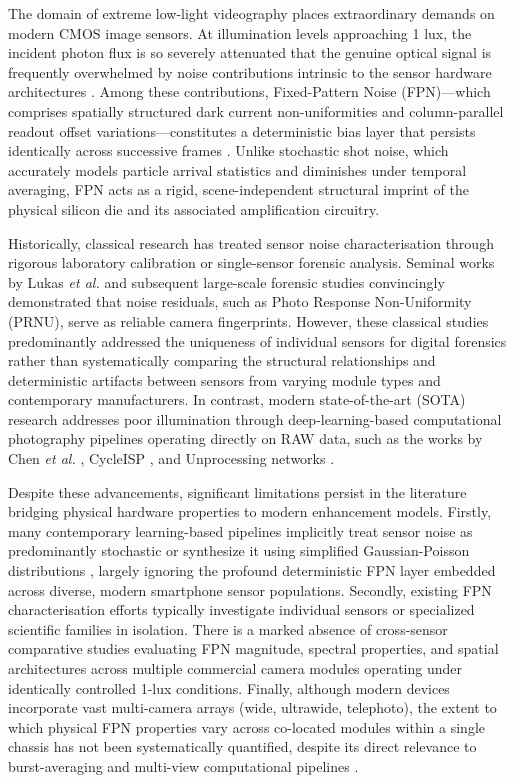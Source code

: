 \documentclass[conference]{IEEEtran}
\begin{document}
The domain of extreme low-light videography places extraordinary demands on modern CMOS image sensors. At illumination levels approaching 1 lux, the incident photon flux is so severely attenuated that the genuine optical signal is frequently overwhelmed by noise contributions intrinsic to the sensor hardware architectures \cite{el2005cmos, janesick2001scientific}. Among these contributions, Fixed-Pattern Noise (FPN)---which comprises spatially structured dark current non-uniformities and column-parallel readout offset variations---constitutes a deterministic bias layer that persists identically across successive frames \cite{tian2001analysis, healey1994radiometric}. Unlike stochastic shot noise, which accurately models particle arrival statistics and diminishes under temporal averaging, FPN acts as a rigid, scene-independent structural imprint of the physical silicon die and its associated amplification circuitry.

Historically, classical research has treated sensor noise characterisation through rigorous laboratory calibration or single-sensor forensic analysis. Seminal works by Lukas \textit{et al.} \cite{lukas2006digital} and subsequent large-scale forensic studies \cite{goljan2009large, li2010source, chen2008determining} convincingly demonstrated that noise residuals, such as Photo Response Non-Uniformity (PRNU), serve as reliable camera fingerprints. However, these classical studies predominantly addressed the uniqueness of individual sensors for digital forensics rather than systematically comparing the structural relationships and deterministic artifacts between sensors from varying module types and contemporary manufacturers. In contrast, modern state-of-the-art (SOTA) research addresses poor illumination through deep-learning-based computational photography pipelines operating directly on RAW data, such as the works by Chen \textit{et al.} \cite{chen2018learning}, CycleISP \cite{zamir2020cycleisp}, and Unprocessing networks \cite{brooks2019unprocessing}. 

Despite these advancements, significant limitations persist in the literature bridging physical hardware properties to modern enhancement models. Firstly, many contemporary learning-based pipelines implicitly treat sensor noise as predominantly stochastic or synthesize it using simplified Gaussian-Poisson distributions \cite{zhang2021rethinking}, largely ignoring the profound deterministic FPN layer embedded across diverse, modern smartphone sensor populations. Secondly, existing FPN characterisation efforts \cite{konnik2014high, el2005cmos} typically investigate individual sensors or specialized scientific families in isolation. There is a marked absence of cross-sensor comparative studies evaluating FPN magnitude, spectral properties, and spatial architectures across multiple commercial camera modules operating under identically controlled 1-lux conditions. Finally, although modern devices incorporate vast multi-camera arrays (wide, ultrawide, telephoto), the extent to which physical FPN properties vary across co-located modules within a single chassis has not been systematically quantified, despite its direct relevance to burst-averaging and multi-view computational pipelines \cite{hasinoff2016burst}.
\end{document}
